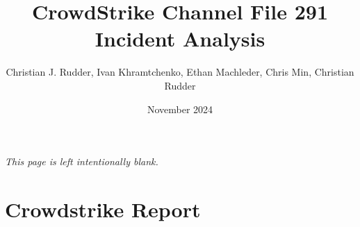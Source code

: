 \documentclass{memoir}
\title{CrowdStrike Channel File 291 Incident Analysis}
\author{Christian J. Rudder, Ivan Khramtchenko, Ethan Machleder, Chris Min, Christian Rudder}
\date{November 2024}
\begin{document}
\maketitle
\setcounter{tocdepth}{2}

\tableofcontents

\newpage
\thispagestyle{empty}
\mbox{}
\vfill
\begin{center}
    \textit{This page is left intentionally blank.}
\end{center}
\vfill
\newpage
\thispagestyle{empty}




\chapter{Crowdstrike Report}




\end{document}

